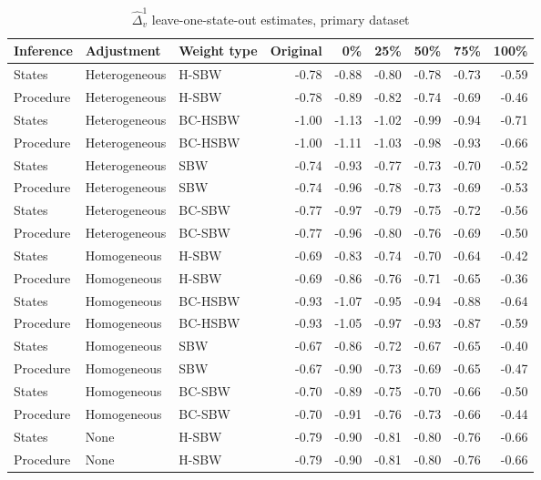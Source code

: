 \begin{table}[ht]
\centering
\label{tab:rdiffc1}
\caption{$\hat{\Delta}^1_v$ leave-one-state-out estimates, primary dataset}
\begin{tabular}{lllrrrrrr}
  \hline
Inference & Adjustment & Weight type & Original & 0\% & 25\% & 50\% & 75\% & 100\% \\ 
  \hline
States & Heterogeneous & H-SBW & -0.78 & -0.88 & -0.80 & -0.78 & -0.73 & -0.59 \\ 
  Procedure & Heterogeneous & H-SBW & -0.78 & -0.89 & -0.82 & -0.74 & -0.69 & -0.46 \\ 
  States & Heterogeneous & BC-HSBW & -1.00 & -1.13 & -1.02 & -0.99 & -0.94 & -0.71 \\ 
  Procedure & Heterogeneous & BC-HSBW & -1.00 & -1.11 & -1.03 & -0.98 & -0.93 & -0.66 \\ 
  States & Heterogeneous & SBW & -0.74 & -0.93 & -0.77 & -0.73 & -0.70 & -0.52 \\ 
  Procedure & Heterogeneous & SBW & -0.74 & -0.96 & -0.78 & -0.73 & -0.69 & -0.53 \\ 
  States & Heterogeneous & BC-SBW & -0.77 & -0.97 & -0.79 & -0.75 & -0.72 & -0.56 \\ 
  Procedure & Heterogeneous & BC-SBW & -0.77 & -0.96 & -0.80 & -0.76 & -0.69 & -0.50 \\ 
  States & Homogeneous & H-SBW & -0.69 & -0.83 & -0.74 & -0.70 & -0.64 & -0.42 \\ 
  Procedure & Homogeneous & H-SBW & -0.69 & -0.86 & -0.76 & -0.71 & -0.65 & -0.36 \\ 
  States & Homogeneous & BC-HSBW & -0.93 & -1.07 & -0.95 & -0.94 & -0.88 & -0.64 \\ 
  Procedure & Homogeneous & BC-HSBW & -0.93 & -1.05 & -0.97 & -0.93 & -0.87 & -0.59 \\ 
  States & Homogeneous & SBW & -0.67 & -0.86 & -0.72 & -0.67 & -0.65 & -0.40 \\ 
  Procedure & Homogeneous & SBW & -0.67 & -0.90 & -0.73 & -0.69 & -0.65 & -0.47 \\ 
  States & Homogeneous & BC-SBW & -0.70 & -0.89 & -0.75 & -0.70 & -0.66 & -0.50 \\ 
  Procedure & Homogeneous & BC-SBW & -0.70 & -0.91 & -0.76 & -0.73 & -0.66 & -0.44 \\ 
  States & None & H-SBW & -0.79 & -0.90 & -0.81 & -0.80 & -0.76 & -0.66 \\ 
  Procedure & None & H-SBW & -0.79 & -0.90 & -0.81 & -0.80 & -0.76 & -0.66 \\ 

\end{tabular}
\end{table}
